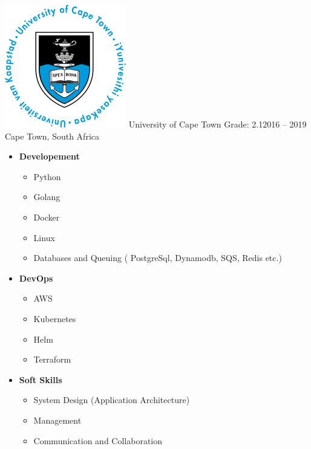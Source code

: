
\includegraphics[scale=0.055]{uct_logo.png}
 {University of Cape Town \break Grade: 2.1}{2016 -- 2019} {Cape Town, South Africa}


\divider
{}
\divider
{}

\begin{itemize}
    \item \textbf{Developement}
    \begin{itemize}
        \item Python
        \item Golang
        \item Docker
        \item Linux
        \item Databases and Queuing ( PostgreSql, Dynamodb, SQS, Redis etc.)
    \end{itemize}
    \divider
    \item \textbf{DevOps}
    \begin{itemize}
        \item AWS 
        \item Kubernetes
        \item Helm
        \item Terraform
    \end{itemize}
    \divider
    \item \textbf{Soft Skills}
    \begin{itemize}
        \item System Design (Application Architecture)
        \item Management
        \item Communication and Collaboration
    \end{itemize}
\end{itemize}